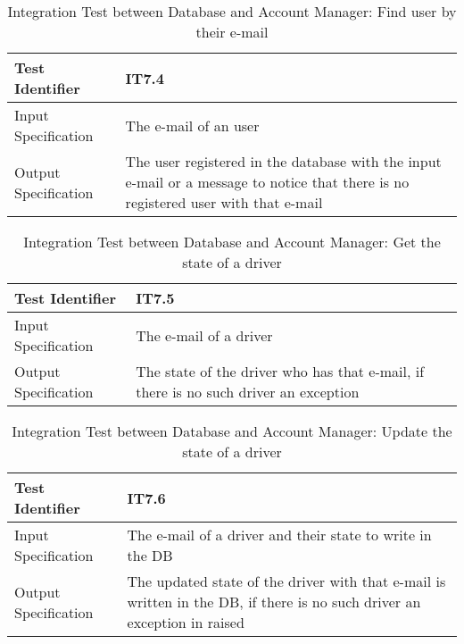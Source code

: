 \documentclass[a4paper]{article}
\begin{document}
\begin{table} [H]
\begin{center}
\begin{tabular}{| L | p{\rightcol} |}
  \hline
  Test Identifier & IT7.4 \\
  \hline
  Input Specification & The e-mail of an user\\
  \hline
  Output Specification & The user registered in the database with the input e-mail or a message to notice that there is no registered user with that e-mail\\
  \hline
\end{tabular}
\end{center}
\caption{Integration Test between Database and Account Manager: Find user by their e-mail}
\end{table}

\begin{table} [H]
\begin{center}
\begin{tabular}{| L | p{\rightcol} |}
  \hline
  Test Identifier & IT7.5 \\
  \hline
  Input Specification & The e-mail of a driver\\
  \hline
  Output Specification & The state of the driver who has that e-mail, if there is no such driver an exception\\
  \hline
\end{tabular}
\end{center}
\caption{Integration Test between Database and Account Manager: Get the state of a driver}
\end{table}

\begin{table} [H]
\begin{center}
\begin{tabular}{| L | p{\rightcol} |}
  \hline
  Test Identifier & IT7.6 \\
  \hline
  Input Specification & The e-mail of a driver and their state to write in the DB\\
  \hline
  Output Specification & The updated state of the driver with that e-mail is written in the DB, if there is no such driver an exception in raised\\
  \hline
\end{tabular}
\end{center}
\caption{Integration Test between Database and Account Manager: Update the state of a driver}
\end{table}
\end{document}

